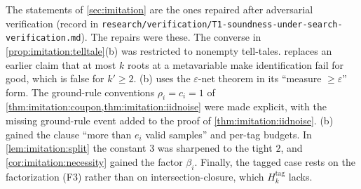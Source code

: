 The statements of \cref{sec:imitation} are the ones repaired after adversarial verification (record in \texttt{research/\allowbreak verification/\allowbreak T1-soundness-under-search-verification.md}). The repairs were these. The converse in \cref{prop:imitation:telltale}(b) was restricted to nonempty tell-tales.  replaces an earlier claim that at most $k$ roots at a metavariable make identification fail for good, which is false for $k'\ge2$. (b) uses the $\varepsilon$-net theorem in its ``measure $\ge\varepsilon$'' form. The ground-rule conventions $\rho_i=c_i=1$ of \cref{thm:imitation:coupon,thm:imitation:iidnoise} were made explicit, with the missing ground-rule event added to the proof of \cref{thm:imitation:iidnoise}. (b) gained the clause ``more than $e_i$ valid samples'' and per-tag budgets. In \cref{lem:imitation:split} the constant $3$ was sharpened to the tight $2$, and \cref{cor:imitation:necessity} gained the factor $\beta_i$. Finally, the tagged case rests on the factorization (F3) rather than on intersection-closure, which $H^{\mathrm{tag}}_k$ lacks.
